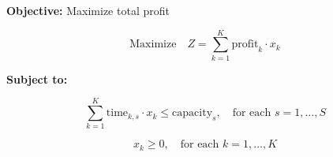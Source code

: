 \documentclass{article}
\begin{document}
\textbf{Objective:} Maximize total profit

\[
\text{Maximize} \quad Z = \sum_{k=1}^{K} \text{profit}_k \cdot x_k
\]

\textbf{Subject to:}

\[
\sum_{k=1}^{K} \text{time}_{k, s} \cdot x_k \leq \text{capacity}_s, \quad \text{for each } s = 1, \ldots, S
\]

\[
x_k \geq 0, \quad \text{for each } k = 1, \ldots, K
\]
\end{document}
